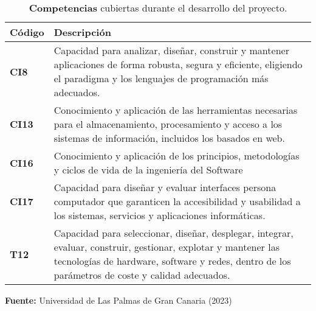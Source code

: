 \begin{table}[H]
    \caption{\textbf{Competencias} cubiertas durante el desarrollo del proyecto.}
    \hfill \break
    \label{tab:competencias}
    \begin{tabularx}{\linewidth}{| @{} >{\bfseries}l | >{\RaggedRight}X @{} | }
        \hline
        \centering \textbf{Código} & \textbf{Descripción} \\
        \hline
        CI8  & Capacidad para analizar, diseñar, construir y mantener 
        aplicaciones de forma robusta, segura y eficiente, eligiendo el 
        paradigma y los lenguajes de programación más adecuados. \\ 
        \hline
        CI13 & Conocimiento y aplicación de las herramientas necesarias para el 
        almacenamiento, procesamiento y acceso a los sistemas de 
        información, incluidos los basados en web. \\ 
        \hline
        CI16 & Conocimiento y aplicación de los principios, metodologías y ciclos 
        de vida de la ingeniería del Software \\
        \hline
        CI17 & Capacidad para diseñar y evaluar interfaces persona computador que 
        garanticen la accesibilidad y usabilidad a los sistemas, servicios y 
        aplicaciones informáticas. \\ 
        \hline
        T12  & Capacidad para seleccionar, diseñar, desplegar, integrar, evaluar, 
        construir, gestionar, explotar y mantener las tecnologías 
        de hardware, software y redes, dentro de los parámetros de coste y 
        calidad adecuados.\\ 
        \hline
    \end{tabularx}
    \hfill \break
    \hfill \break
    \centering\textbf{Fuente:} Universidad de Las Palmas de Gran Canaria (2023)
\end{table}